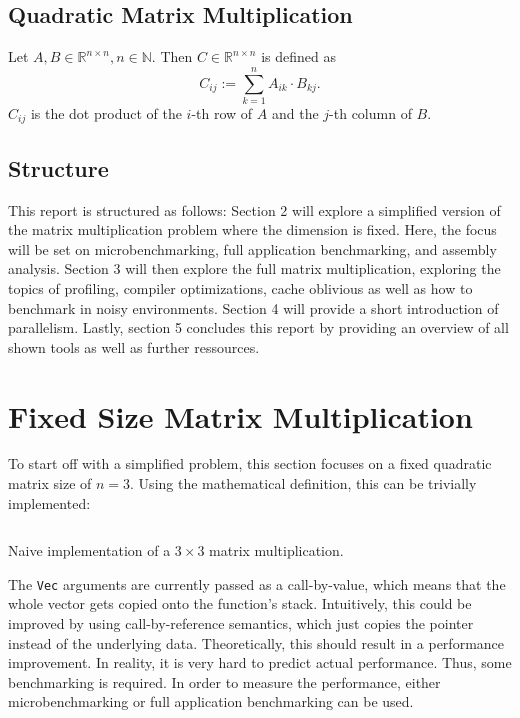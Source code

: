 \subsection{Quadratic Matrix Multiplication}

Let $A, B \in \mathbb{R}^{n\times n}, n \in \mathbb{N}$. Then $C \in \mathbb{R}^{n \times n}$ is defined as
\[
  C_{ij} := \sum_{k=1}^n A_{ik} \cdot B_{kj}.
\]
$C_{ij}$ is the dot product of the $i$-th row of $A$ and the $j$-th column of $B$.

\subsection{Structure}
This report is structured as follows: Section 2 will explore a simplified version of the matrix multiplication problem where the dimension is fixed. Here, the focus will be set on microbenchmarking, full application benchmarking, and assembly analysis. Section 3 will then explore the full matrix multiplication, exploring the topics of profiling, compiler optimizations, cache oblivious as well as how to benchmark in noisy environments. Section 4 will provide a short introduction of parallelism. Lastly, section 5 concludes this report by providing an overview of all shown tools as well as further ressources.

\section{Fixed Size Matrix Multiplication}
To start off with a simplified problem, this section focuses on a fixed quadratic matrix size of $n=3$. Using the mathematical definition, this can be trivially implemented:

\begin{listing}[H]
  \inputminted{rust}{./assets/first_impl.rs}
\caption{Naive implementation of a $3\times3$ matrix multiplication.}
\label{lst:hello}
\end{listing}

The \texttt{Vec} arguments are currently passed as a call-by-value, which means that the whole vector gets copied onto the function's stack. Intuitively, this could be improved by using call-by-reference semantics, which just copies the pointer instead of the underlying data. Theoretically, this should result in a performance improvement. In reality, it is very hard to predict actual performance. Thus, some benchmarking is required. In order to measure the performance, either microbenchmarking or full application benchmarking can be used.

